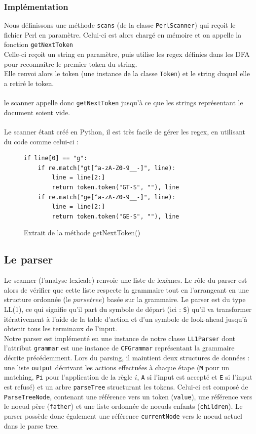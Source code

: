 \documentclass[a4paper,10pt]{article}
\begin{document}
	\subsubsection{Implémentation}
	Nous définissons une méthode \verb?scans? (de la classe \verb?PerlScanner?) qui reçoit le fichier Perl en paramètre. Celui-ci est alors chargé en mémoire et on appelle la fonction \verb?getNextToken?\\
	Celle-ci reçoit un string en paramètre, puis utilise les regex définies dans les DFA pour reconnaître le premier token du string.\\
	Elle renvoi alors le token (une instance de la classe \verb?Token?) et le string duquel elle a retiré le token.\\
	~\\
	le scanner appelle donc \verb?getNextToken? jusqu'à ce que les strings représentant le document soient vide.\\
	~\\
	Le scanner étant créé en Python, il est très facile de gérer les regex, en utilisant du code comme celui-ci :
\begin{figure}[H]
\begin{lstlisting}
if line[0] == "g":
	if re.match("gt[^a-zA-Z0-9__-]", line):
		line = line[2:]
		return token.token("GT-S", ""), line
	if re.match("ge[^a-zA-Z0-9__-]", line):
		line = line[2:]
		return token.token("GE-S", ""), line
\end{lstlisting}
\fontfamily{}
\caption{Extrait de la méthode getNextToken()}
\label{lst:getNextToken}
\end{figure}

\subsection{Le parser}

Le scanner (l'analyse lexicale) renvoie une liste de lexèmes. Le rôle du parser est alors de vérifier que cette liste respecte la grammaire tout en l'arrangeant en une structure ordonnée (le $parse tree$) basée sur la grammaire. Le parser est du type LL(1), ce qui signifie qu'il part du symbole de départ (ici : \verb?S?) qu'il va transformer itérativement à l'aide de la table d'action et d'un symbole de look-ahead jusqu'à obtenir tous les terminaux de l'input.\\

Notre parser est implémenté en une instance de notre classe \verb?LL1Parser? dont l'attribut \verb?grammar? est une instance de \verb?CFGrammar? représentant la grammaire décrite précédemment. Lors du parsing, il maintient deux structures de données : une liste \verb?output? décrivant les actions effectuées à chaque étape (\verb?M? pour un matching, \verb?Pi? pour l'application de la règle $i$, \verb?A? si l'input est accepté et \verb?E? si l'input est refusé) et un arbre \verb?parseTree? structurant les tokens. Celui-ci est composé de \verb?ParseTreeNode?, contenant une référence vers un token (\verb?value?), une référence vers le noeud père (\verb?father?) et une liste ordonnée de noeuds enfants (\verb?children?). Le parser possède donc également une référence \verb?currentNode? vers le noeud actuel dans le parse tree.\\
\end{document}
